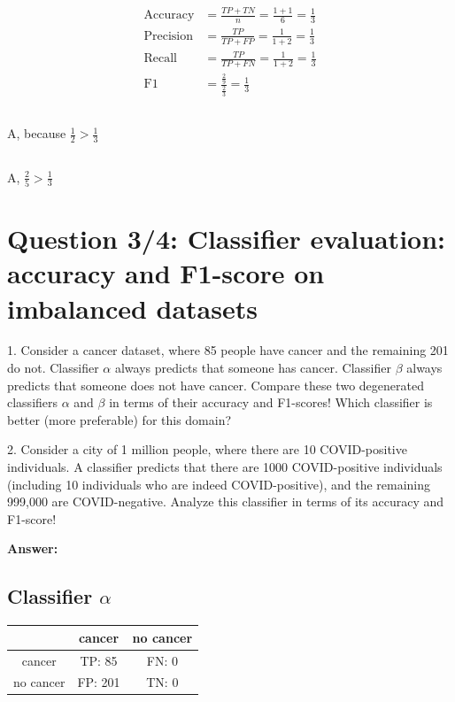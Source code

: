 \documentclass[12pt,a4paper]{article}
\begin{document}
\begin{align*}
  \text{Accuracy}  & = \frac{TP+TN}{n} = \frac{1+1}{6} = \frac{1}{3}    \\
  \text{Precision} & = \frac{TP}{TP + FP} = \frac{1}{1+2} = \frac{1}{3} \\
  \text{Recall}    & = \frac{TP}{TP+FN} = \frac{1}{1+2} = \frac{1}{3}   \\
  \text{F1}        & = \frac{\frac{2}{9}}{\frac{2}{3}} = \frac{1}{3}
\end{align*}

\subsection*{}
A, because $\frac{1}{2} > \frac{1}{3}$

\subsection*{}
A, $\frac{2}{5} > \frac{1}{3}$

\section*{Question 3/4: Classifier evaluation: accuracy and F1-score on imbalanced datasets}

1. Consider a cancer dataset, where 85 people have cancer and the remaining 201 do not. Classifier $\alpha$ always predicts that someone has cancer. Classifier $\beta$ always predicts that someone does not have cancer. Compare these two degenerated classifiers $\alpha$ and $\beta$ in terms of their accuracy and F1-scores! Which classifier is better (more preferable) for this domain?

2. Consider a city of 1 million people, where there are 10 COVID-positive individuals. A classifier predicts that there are 1000 COVID-positive individuals (including 10 individuals who are indeed COVID-positive), and the remaining 999,000 are COVID-negative. Analyze this classifier in terms of its accuracy and F1-score!

\textbf{Answer:}

\subsection*{Classifier $\alpha$}
\begin{table}[H]
  \centering
  \begin{tabular}{ccc}
    \toprule
              & cancer  & no cancer \\
    \midrule
    cancer    & TP: 85  & FN: 0     \\
    no cancer & FP: 201 & TN: 0     \\
    \bottomrule
  \end{tabular}
\end{table}
\end{document}
